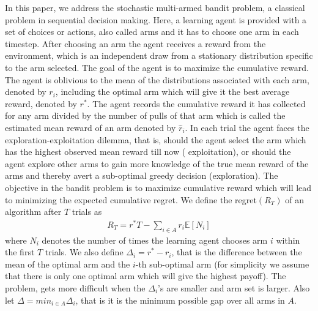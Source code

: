 In this paper, we address the stochastic multi-armed bandit problem, a classical problem in sequential decision making. Here, a learning agent is provided with a set of choices or actions, also called arms and it has to choose one arm in each timestep. After choosing an arm the agent receives a reward from the environment, which is an independent draw from a stationary distribution specific to the arm selected. The goal of the agent is to maximize the cumulative reward. The agent is oblivious to the mean of the distributions associated with each arm, denoted by $r_{i}$, including the optimal arm which will give it the best average reward, denoted by $r^{*}$. The agent records the cumulative reward it has collected for any arm divided by the number of pulls of that arm which is called the estimated mean reward of an arm denoted by $\hat{r}_{i}$. In each trial the agent faces the exploration-exploitation dilemma, that is, should the agent select the arm which has the highest observed mean reward till now (
exploitation), or should the agent explore other arms to gain more knowledge of the true mean reward of the arms and thereby avert a sub-optimal greedy decision (exploration). The objective in the bandit problem is to maximize cumulative reward which will lead to minimizing the expected cumulative regret. We define the regret$(R_{T})$ of an algorithm after $T$ trials as
\begin{align*}
R_{T}=r^{*}T - \sum_{i\in A} r_{i}\mathbb{E}[N_{i}]
\end{align*}
where $N_{i}$ denotes the number of times the learning agent chooses arm $i$ within the first $T$ trials. We also define $\Delta_{i}=r^{*}-r_{i}$, that is the difference between the mean of the optimal arm and the $i$-th sub-optimal arm (for simplicity we assume that there is only one optimal arm which will give the highest payoff). The problem, gets more difficult when the $\Delta_{i}$'s are smaller and arm set is larger. Also let $\Delta=min_{i\in A}\Delta_{i}$, that is it is the minimum possible gap over all arms in $A$.
                                                                                                                                          

